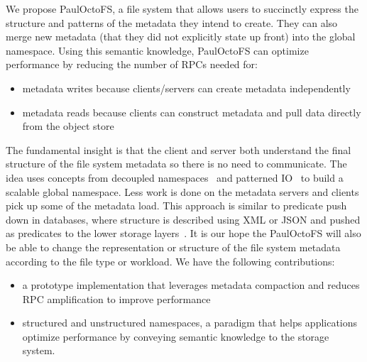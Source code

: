  
We propose PaulOctoFS, a file system that allows users to succinctly express
the structure and patterns of the metadata they intend to create.  They can
also merge new metadata (that they did not explicitly state up front) into the
global namespace.  Using this semantic knowledge, PaulOctoFS can optimize
performance by reducing the number of RPCs needed for:

\begin{itemize}

  \item metadata writes because clients/servers can create metadata
  independently

  \item metadata reads because clients can construct metadata and pull data
  directly from the object store

\end{itemize}

The fundamental insight is that the client and server both understand the final
structure of the file system metadata so there is no need to communicate.  The
idea uses concepts from decoupled namespaces~\cite{zheng:pdsw2014-batchfs,
zheng:pdsw2015-deltafs} and patterned IO~\cite{he:hpdc13-plfs-patterns} to
build a scalable global namespace. Less work is done on the metadata servers
and clients pick up some of the metadata load.  This approach is similar to
predicate push down in databases, where structure is described using XML or
JSON and pushed as predicates to the lower storage
layers~\cite{shel:pc17-pushdown}. It is our hope the PaulOctoFS will also be
able to change the representation or structure of the file system metadata
according to the file type or workload.  We have the following contributions:

\begin{itemize}

  \item a prototype implementation that leverages metadata compaction and
  reduces RPC amplification to improve performance

  \item structured and unstructured namespaces, a paradigm that helps
  applications optimize performance by conveying semantic knowledge to the
  storage system.

\end{itemize}
